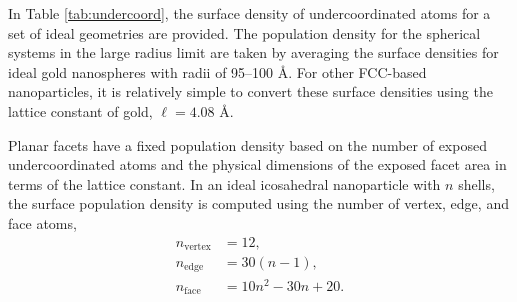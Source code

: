 In Table \ref{tab:undercoord}, the surface density of
undercoordinated atoms for a set of ideal geometries are provided.
The population
density for the spherical systems in the large radius limit are taken by
averaging the surface densities for ideal gold nanospheres with radii
of 95--100 \AA.  For other FCC-based nanoparticles, it is relatively
simple to convert these surface densities using the lattice constant
of gold, $\ell = 4.08 \text{~\AA}$.

Planar facets have a fixed population density based on the number of
exposed undercoordinated atoms and the physical dimensions of the
exposed facet area in terms of the lattice constant.
In an ideal icosahedral nanoparticle with $n$ shells, the surface
population density is computed using the number of vertex, edge, and
face atoms,
\begin{align}
n_\text{vertex} & = 12, \\
n_\text{edge} & = 30 (n -1), \\
n_\text{face} & = 10 n^2 - 30 n + 20.
\end{align}

